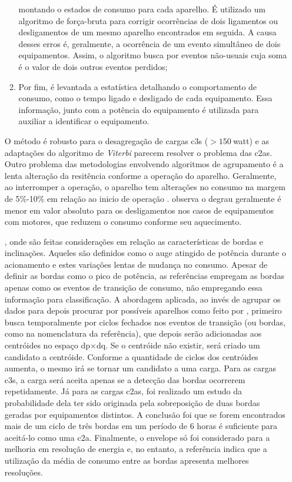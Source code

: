 \begin{enumerate}[label=\textbf{1.\arabic*},wide=\parindent]
\begin{enumerate}[label=\arabic*]
montando o estados de consumo para cada aparelho. É utilizado um
algoritmo de força-bruta para corrigir ocorrências de dois ligamentos
ou desligamentos de um mesmo aparelho encontrados em seguida. A causa
desses erros é, geralmente, a ocorrência de um evento simultâneo de
dois equipamentos. Assim, o algoritmo busca por eventos não-usuais
cuja soma é o valor de dois outros eventos perdidos;
\item Por fim, é levantada a estatística detalhando o
comportamento de consumo, como o tempo ligado e desligado de cada
equipamento. Essa informação, junto com a potência do equipamento é
utilizada para auxiliar a identificar o equipamento. 
\end{enumerate}

O método é robusto para o desagregação de cargas \glspl{c3}
($> 150~$\acs{watt}) e as adaptações \cite{nilm_bouloutas_viterbi_ext_1991_11,
nilm_hart_fsm_viterbi_1993_12} do algoritmo de \emph{Viterbi}
parecem resolver o problema das \glspl{c2a}. Outro problema das
metodologias envolvendo algoritmos de agrupamento é a lenta alteração
da resitência conforme a operação do aparelho. Geralmente, ao
interromper a operação, o aparelho tem alterações no consumo na margem
de 5\%-10\% em relação ao inicio de operação
\cite{nilm_sultanem_1991_10}. \citeauthor*{nilm_hart_1992_8} observa
o degrau geralmente é menor em valor absoluto para os desligamentos
nos casos de equipamentos com motores, que reduzem o consumo conforme
seu aquecimento.

\citet*{nilm_cole_data_extraction_1998_14,
nilm_cole_extra_info_surge_1998_15}, 
onde são feitas considerações em relação as características de bordas e
inclinações. Aqueles são definidos como o auge atingido de potência
durante o acionamento e estes variações lentas de mudança no consumo.
Apesar de definir as bordas como o pico de potência, as referências
empregam as bordas apenas como os eventos de transição de consumo, não
empregando essa informação para classificação. A abordagem aplicada,
ao invés de agrupar os dados para depois procurar por possíveis
aparelhos como feito por \citeauthor*{nilm_hart_1992_8}, primeiro
busca temporalmente por ciclos fechados nos eventos de transição (ou
bordas, como na nomenclatura da referência), que depois serão
adicionadas aos centróides no espaço
\acs{dp}$\times$\acs{dq}. Se o centróide não existir, será
criado um candidato a centróide. Conforme a quantidade de ciclos dos
centróides aumenta, o mesmo irá se tornar um candidato a uma carga.
Para as cargas \glspl{c3}, a carga será aceita apenas se a detecção
das bordas ocorrerem repetidamente. Já para as cargas \glspl{c2a}, foi
realizado um estudo da probabilidade dela ter sido originada pela
sobreposição de duas bordas geradas por equipamentos distintos. A
conclusão foi que se forem encontrados mais de um ciclo de três bordas
em um período de 6 horas é suficiente para aceitá-lo como uma
\gls{c2a}. Finalmente, o envelope só foi considerado para a melhoria
em resolução de energia e, no entanto, a referência indica que a
utilização da média de consumo entre as bordas apresenta melhores
resoluções.


\end{enumerate}
